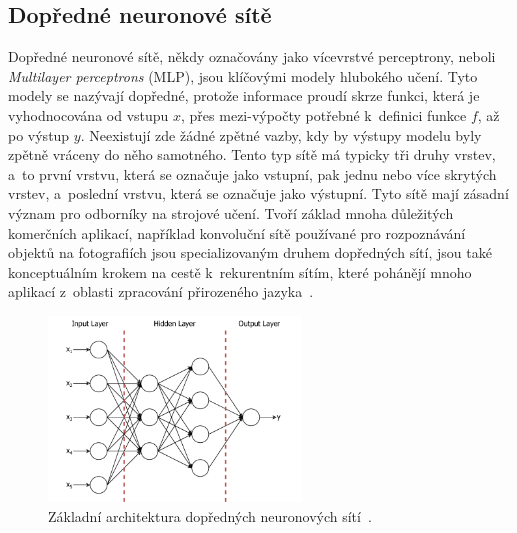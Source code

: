 \subsection{Dopředné neuronové sítě}
Dopředné neuronové sítě, někdy označovány jako vícevrstvé perceptrony, neboli \textit{Multilayer perceptrons} (MLP), jsou klíčovými modely hlubokého učení. Tyto modely se nazývají dopředné, protože informace proudí skrze funkci, která je vyhodnocována od vstupu $x$, přes mezi-výpočty potřebné k~definici funkce $f$, až po výstup $y$. Neexistují zde žádné zpětné vazby, kdy by výstupy modelu byly zpětně vráceny do něho samotného. Tento typ sítě má typicky tři druhy vrstev, a~to první vrstvu, která se označuje jako vstupní, pak jednu nebo více skrytých vrstev, a~poslední vrstvu, která se označuje jako výstupní. Tyto sítě mají zásadní význam pro odborníky na strojové učení. Tvoří základ mnoha důležitých komerčních aplikací, například konvoluční sítě používané pro rozpoznávání objektů na fotografiích jsou specializovaným druhem dopředných sítí, jsou také konceptuálním krokem na cestě k~rekurentním sítím, které pohánějí mnoho aplikací z~oblasti zpracování přirozeného jazyka~\cite{Goodfellow-et-al-2016}.
\begin{figure}[H]
	\centering
	\includegraphics[width=0.6\textwidth]{obrazky-figures/ffnn.png}
	\caption{Základní architektura dopředných neuronových sítí~\cite{Schmitt2022}.}
	\label{ffnn_pic}
\end{figure}

